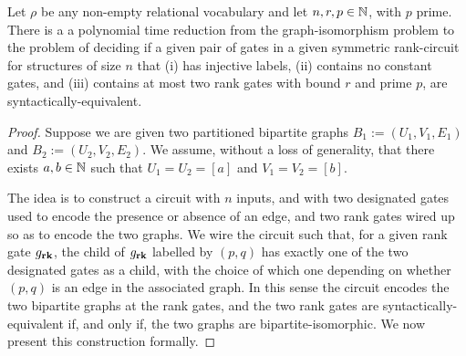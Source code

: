 \documentclass[../paper.tex]{subfiles}
\begin{document}
\begin{prop}
  Let $\rho$ be any non-empty relational vocabulary and let $n, r, p \in \mathbb{N}$,
  with $p$ prime. There is a a polynomial time reduction from the
  graph-isomorphism problem to the problem of deciding if a given pair of gates
  in a given symmetric rank-circuit for structures of size $n$ that (i) has
  injective labels, (ii) contains no constant gates, and (iii) contains at most
  two rank gates with bound $r$ and prime $p$, are syntactically-equivalent.
  \label{prop:syntactic-graph-iso}
\end{prop}
\begin{proof}
  Suppose we are given two partitioned bipartite graphs $B_1 := (U_1, V_1, E_1)$
  and $B_2 := (U_2, V_2, E_2)$. We assume, without a loss of generality, that
  there exists $a, b \in \mathbb{N}$ such that $U_1 = U_2 = [a]$ and $V_1 = V_2 =
  [b]$.

  The idea is to construct a circuit with $n$ inputs, and with two designated
  gates used to encode the presence or absence of an edge, and two rank gates
  wired up so as to encode the two graphs. We wire the circuit such that, for a
  given rank gate $g_{\text{\textbf{rk}}}$, the child of $g_{\text{\textbf{rk}}}$ labelled by $(p,q)$ has
  exactly one of the two designated gates as a child, with the choice of which
  one depending on whether $(p,q)$ is an edge in the associated graph. In this
  sense the circuit encodes the two bipartite graphs at the rank gates, and the
  two rank gates are syntactically-equivalent if, and only if, the two graphs
  are bipartite-isomorphic. We now present this construction formally.


\end{proof}
\end{document}

